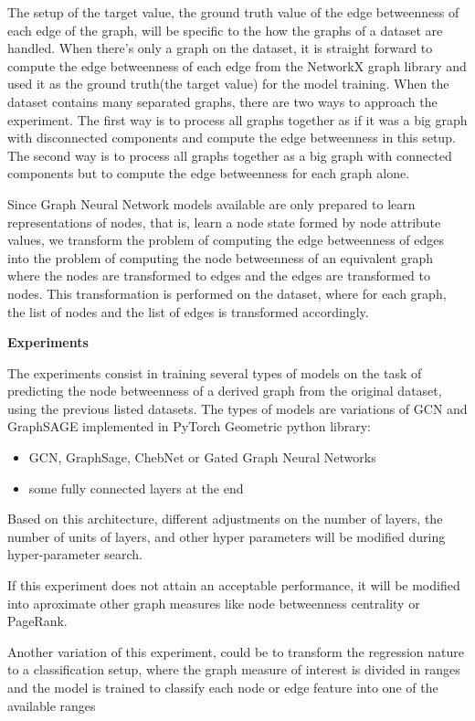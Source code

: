 The setup of the target value, the ground truth value of the edge betweenness of each edge of the graph, will be specific to the how the graphs of a dataset are handled. When there's only a graph on the dataset, it is straight forward to compute the edge betweenness of each edge from the NetworkX graph library and used it as the ground truth(the target value) for the model training. When the dataset contains many separated graphs, there are two ways to approach the experiment. The first way is to process all graphs together as if it was a big graph with disconnected components and compute the edge betweenness in this setup. The second way is to process all graphs together as a big graph with connected components but to compute the edge betweenness for each graph alone. 


Since Graph Neural Network models available are only prepared to learn representations of nodes, that is, learn a node state formed by node attribute values, we transform the problem of computing the edge betweenness of edges into the problem of computing the node betweenness of an equivalent graph where the nodes are transformed to edges and the edges are transformed to nodes. This transformation is performed on the dataset, where for each graph, the list of nodes and the list of edges is transformed accordingly. 

\textbf{Experiments}

The experiments consist in training several types of models on the task of predicting the node betweenness of a derived graph from the original dataset, using the previous listed  datasets. The types of models are variations of GCN and GraphSAGE implemented in PyTorch Geometric python library:
\begin{itemize}
	\item GCN, GraphSage, ChebNet or Gated Graph Neural Networks
	\item some fully connected layers at the end
\end{itemize}
Based on this architecture, different adjustments on the number of layers, the number of units of layers, and other hyper parameters will be modified during hyper-parameter search.

If this experiment does not attain an acceptable performance, it will be modified into aproximate other graph measures like node betweenness centrality or PageRank.

Another variation of this experiment, could be to transform the regression nature to a classification setup, where the graph measure of interest is divided in ranges and the model is trained to classify each node or edge feature into one of the available ranges

